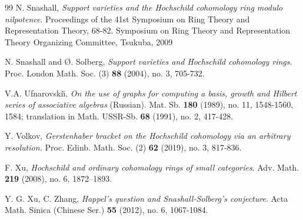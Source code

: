 \documentclass[10pt, reqno]{amsart}
\theoremstyle{definition}
\theoremstyle{remark}
\numberwithin{equation}{section}
\begin{document}
\begin{thebibliography}{99}
  N. Snashall,
\emph{Support varieties and the Hochschild cohomology ring modulo nilpotence}.  Proceedings of the 41st Symposium on Ring Theory and Representation Theory, 68-82.
Symposium on Ring Theory and Representation Theory Organizing Committee, Tsukuba, 2009


  N. Snashall and Ø. Solberg, 
\emph{Support varieties and Hochschild cohomology rings}.  
Proc. London Math. Soc. (3) \textbf{88} (2004), no. 3, 705-732.


V.A. Ufnarovski\u{\i}, \emph{On the use of graphs for computing a basis, growth and Hilbert series of associative algebras} (Russian). Mat. Sb. \textbf{180} (1989), no. 11, 1548-1560, 1584; translation in Math. USSR-Sb. \textbf{68} (1991), no. 2, 417-428.


 Y. Volkov, 
\emph{Gerstenhaber bracket on the Hochschild cohomology via an arbitrary resolution.}
Proc. Edinb. Math. Soc. (2) \textbf{62} (2019), no. 3, 817-836.
 
  F. Xu, \emph{Hochschild and ordinary cohomology rings of small categories}. Adv. Math.  \textbf{219}  (2008),  no. 6, 1872–1893.

  Y. G.  Xu, C. Zhang,  
\emph{Happel's question and Snashall-Solberg's conjecture}. 
Acta Math. Sinica (Chinese Ser.) \textbf{55} (2012), no. 6, 1067-1084.


\end{thebibliography}



\end{document}

